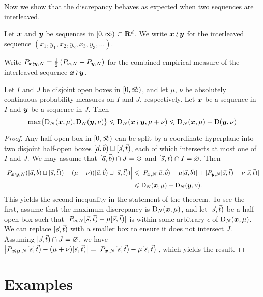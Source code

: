 Now we show that the discrepancy behaves as expected when two sequences are 
interleaved. 

\begin{definition}
Let ${\boldsymbol x}$ and ${\boldsymbol y}$ be sequences in $[0,\vec{\infty})\subset \mathbf{R}^d$. We write 
${\boldsymbol x}\wr{\boldsymbol y}$ for the interleaved sequence $(x_1,y_1,x_2,y_2,x_3,y_3,\dots)$. 
\end{definition}

Write 
$P_{{\boldsymbol x}\wr{\boldsymbol y},N} = \frac{1}{2} \left( P_{{\boldsymbol x},N} + P_{{\boldsymbol y},N}\right)$ for the 
combined empirical measure of the interleaved sequence ${\boldsymbol x}\wr{\boldsymbol y}$. 

\begin{theorem}\label{thm:wreath-seq}
Let $I$ and $J$ be disjoint open boxes in $[0,\vec{\infty})$, and let $\mu$, 
$\nu$ be absolutely continuous probability measures on $I$ and $J$, 
respectively. Let ${\boldsymbol x}$ be a sequence in $I$ and ${\boldsymbol y}$ be a sequence in $J$. 
Then 
\[
	\max\{\operatorname{D}_N({\boldsymbol x},\mu),\operatorname{D}_N({\boldsymbol y},\nu)\} \leqslant \operatorname{D}_N({\boldsymbol x}\wr{\boldsymbol y}, \mu+\nu) \leqslant \operatorname{D}_N({\boldsymbol x},\mu) + \operatorname{D}({\boldsymbol y},\nu)
\]
\end{theorem}
\begin{proof}
Any half-open box in $[0,\vec{\infty})$ can be split by a coordinate 
hyperplane into two disjoint half-open boxes $[\vec{a},\vec{b})\sqcup [\vec{s},\vec{t})$, each 
of which intersects at most one of $I$ and $J$. We may assume that 
$[\vec{a},\vec{b})\cap J=\varnothing$ and $[\vec{s},\vec{t})\cap I = \varnothing$. Then 
\begin{align*}
	\left| P_{{\boldsymbol x}\wr{\boldsymbol y},N}([\vec{a},\vec{b})\sqcup [\vec{s},\vec{t})) - (\mu+\nu)([\vec{a},\vec{b})\sqcup[\vec{s},\vec{t}))\right| 
		&\leqslant |P_{{\boldsymbol x},N}[\vec{a},\vec{b}) - \mu[\vec{a},\vec{b})| + |P_{{\boldsymbol y},N}[\vec{s},\vec{t}) - \nu[\vec{s},\vec{t})| \\
		&\leqslant \operatorname{D}_N({\boldsymbol x},\mu) + \operatorname{D}_N({\boldsymbol y},\nu) .
\end{align*}
This yields the second inequality in the statement of the theorem. To see the 
first, assume that the maximum discrepancy is $\operatorname{D}_N({\boldsymbol x},\mu)$, and let 
$[\vec{s},\vec{t})$ be a half-open box such that $|P_{{\boldsymbol x},N}[\vec{s},\vec{t}) - \mu[\vec{s},\vec{t})|$ 
is within some arbitrary $\epsilon$ of $\operatorname{D}_N({\boldsymbol x},\mu)$. We can replace 
$[\vec{s},\vec{t})$ with a smaller box to ensure it does not intersect $J$. Assuming 
$[\vec{s},\vec{t})\cap J=\varnothing$, we have
$\left|P_{{\boldsymbol x}\wr{\boldsymbol y},N}[\vec{s},\vec{t}) - (\mu+\nu)[\vec{s},\vec{t})\right| = |P_{{\boldsymbol x},N}[\vec{s},\vec{t}) - \mu[\vec{s},\vec{t})|$, 
which yields the result. 
\end{proof}





\section{Examples}

